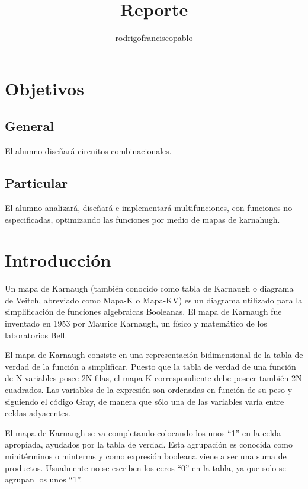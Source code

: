 \documentclass{mylib/reporteConCalif}
\title{Reporte}
\author{rodrigofranciscopablo }
\begin{document}
\coverPage

\tableofcontents
\newpage

\section{Objetivos}

\subsection{General}

El alumno diseñará circuitos combinacionales.

\subsection{Particular}

El alumno analizará, diseñará e implementará multifunciones, con funciones no especificadas,
optimizando las funciones por medio de mapas de karnahugh.

\section{Introducción}

Un mapa de Karnaugh (también conocido como tabla de Karnaugh o diagrama de Veitch, abreviado como Mapa-K o Mapa-KV) es un diagrama utilizado para la simplificación de funciones algebraicas Booleanas. El mapa de Karnaugh fue inventado en 1953 por Maurice Karnaugh, un físico y matemático de los laboratorios Bell.

El mapa de Karnaugh consiste en una representación bidimensional de la tabla de verdad de la función a simplificar. Puesto que la tabla de verdad de una función de N variables posee 2N filas, el mapa K correspondiente debe poseer también 2N cuadrados. Las variables de la expresión son ordenadas en función de su peso y siguiendo el código Gray, de manera que sólo una de las variables varía entre celdas adyacentes. 

El mapa de Karnaugh se va completando colocando los unos “1” en la celda apropiada, ayudados por la tabla de verdad. Esta agrupación
es conocida como minitérminos o minterms y como expresión booleana viene a ser una suma de productos. Usualmente no se escriben los ceros
“0” en la tabla, ya que solo se agrupan los unos “1”.
\end{document}
